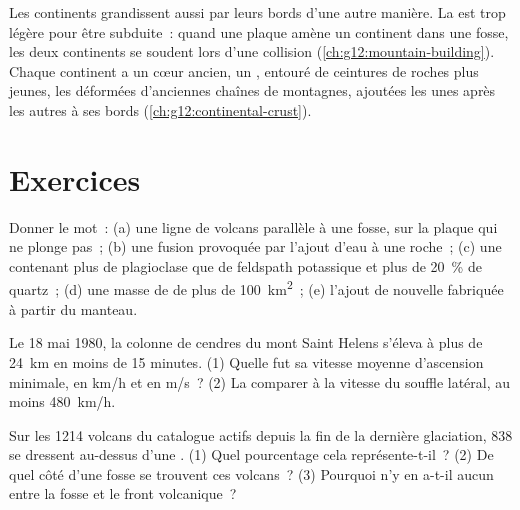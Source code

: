 Les continents grandissent aussi par leurs bords d'une autre manière. La
 est trop légère pour être subduite~: quand une plaque
amène un continent dans une fosse, les deux continents se soudent lors
d'une collision (\cref{ch:g12:mountain-building}). Chaque continent a un
cœur ancien, un , entouré de ceintures de roches plus jeunes, les
 déformées d'anciennes chaînes de montagnes, ajoutées les unes après
les autres à ses bords (\cref{ch:g12:continental-crust}).

\section{Exercices}

\begin{exercise}[$\star$]\label{exo:g12:subduction-magmatism:1}
Donner le mot~: (a) une ligne de volcans parallèle à une fosse, sur la
plaque qui ne plonge pas~; (b) une fusion provoquée par l'ajout d'eau à une
roche~; (c) une  contenant plus de plagioclase que de
feldspath potassique et plus de \qty{20}{\percent} de quartz~; (d) une
masse de  de plus de \qty{100}{km^2}~; (e) l'ajout de
 nouvelle fabriquée à partir du manteau.
\end{exercise}

\begin{exercise}[$\star$]\label{exo:g12:subduction-magmatism:2}
Le 18 mai 1980, la colonne de cendres du mont Saint Helens s'éleva à plus
de \qty{24}{km} en moins de 15 minutes. (1) Quelle fut sa vitesse moyenne
d'ascension minimale, en \unit{km/h} et en \unit{m/s}~? (2) La comparer à
la vitesse du souffle latéral, au moins \qty{480}{km/h}.
\end{exercise}

\begin{exercise}[$\star$]\label{exo:g12:subduction-magmatism:3}
Sur les 1214 volcans du catalogue actifs depuis la fin de la dernière
glaciation, 838 se dressent au-dessus d'une . (1) Quel
pourcentage cela représente-t-il~? (2) De quel côté d'une fosse se trouvent
ces volcans~? (3) Pourquoi n'y en a-t-il aucun entre la fosse et le front
volcanique~?
\end{exercise}

